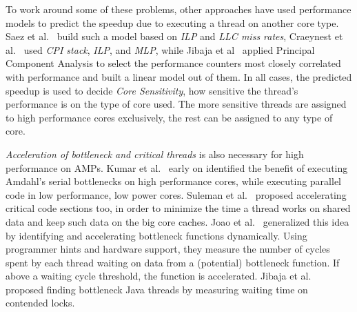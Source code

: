 To work around some of these problems, other approaches have used performance models to predict the speedup due to executing a thread on another core type. Saez et al.~\cite{saez2012leveraging} build such a model based on \emph{ILP} and \emph{LLC miss rates}, Craeynest et al.~\cite{van2012scheduling} used \emph{CPI stack}, \emph{ILP}, and \emph{MLP}, while Jibaja et al~\cite{jibaja2016portable} applied Principal Component Analysis to select the performance counters most closely correlated with performance and built a linear model out of them. In all cases, the predicted speedup is used to decide \emph{Core Sensitivity}, how sensitive the thread's performance is on the type of core used. The more sensitive threads are assigned to high performance cores exclusively, the rest can be assigned to any type of core.


\emph{Acceleration of bottleneck and critical threads} is also necessary for high performance on AMPs. Kumar et al.~\cite{Kumar:2005:HCM:1100859.1100890} early on identified the benefit of executing Amdahl's serial bottlenecks on high performance cores, while executing parallel code in low performance, low power cores. Suleman et al.~\cite{suleman2009accelerating} proposed accelerating critical code sections too, in order to minimize the time a thread works on shared data and keep such data on the big core caches. Joao et al.~\cite{joao2012bottleneck,joao2013utility} generalized this idea by identifying and accelerating bottleneck functions dynamically. Using programmer hints and hardware support, they measure the number of cycles spent by each thread waiting on data from a (potential) bottleneck function. If above a waiting cycle threshold, the function is accelerated. Jibaja et al.~\cite{jibaja2016portable} proposed finding bottleneck Java threads by measuring waiting time on contended locks.

